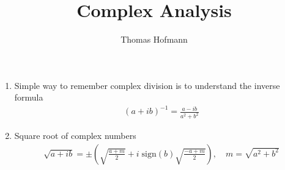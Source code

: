 \documentclass[10pt,a4pape]{article}
\author{Thomas Hofmann}
\title{Complex Analysis}
\begin{document}
\maketitle

\begin{enumerate}
\item Simple way to remember complex division is to understand the inverse formula
\begin{align}
(a + ib )^{-1} = \frac{a - ib}{a^2 + b^2} 
\end{align}
\item Square root of complex numbers
\begin{align}
\sqrt{a + ib} =   \pm\left(  \sqrt{\frac{a+m }2} +i \; \text{sign}(b) \sqrt{\frac{-a +m}{2}}\right), \quad m = \sqrt{a^2 + b^2}
\end{align}
\end{enumerate}




\end{document}
